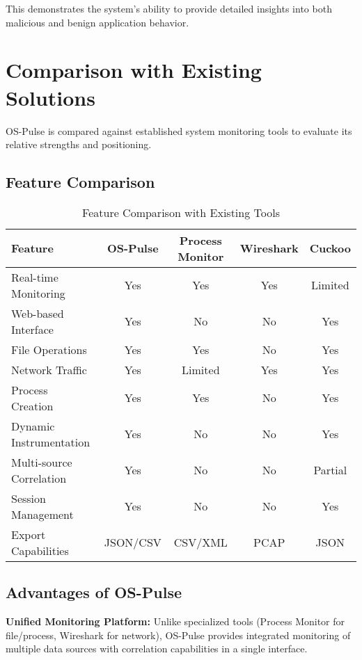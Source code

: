 This demonstrates the system's ability to provide detailed insights into both malicious and benign application behavior.

\section{Comparison with Existing Solutions}

OS-Pulse is compared against established system monitoring tools to evaluate its relative strengths and positioning.

\subsection{Feature Comparison}

\begin{table}[h]
\centering
\small
\begin{tabular}{|l|c|c|c|c|}
\hline
\textbf{Feature} & \textbf{OS-Pulse} & \textbf{Process Monitor} & \textbf{Wireshark} & \textbf{Cuckoo} \\
\hline
Real-time Monitoring & Yes & Yes & Yes & Limited \\
Web-based Interface & Yes & No & No & Yes \\
File Operations & Yes & Yes & No & Yes \\
Network Traffic & Yes & Limited & Yes & Yes \\
Process Creation & Yes & Yes & No & Yes \\
Dynamic Instrumentation & Yes & No & No & Yes \\
Multi-source Correlation & Yes & No & No & Partial \\
Session Management & Yes & No & No & Yes \\
Export Capabilities & JSON/CSV & CSV/XML & PCAP & JSON \\
\hline
\end{tabular}
\caption{Feature Comparison with Existing Tools}
\end{table}

\subsection{Advantages of OS-Pulse}

\textbf{Unified Monitoring Platform:}
Unlike specialized tools (Process Monitor for file/process, Wireshark for network), OS-Pulse provides integrated monitoring of multiple data sources with correlation capabilities in a single interface.

